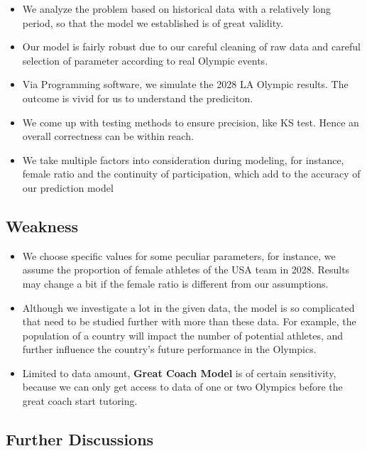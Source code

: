 \begin{itemize}
\item We analyze the problem based on historical data with a relatively long period, so that the model we established is of great validity.

\item Our model is fairly robust due to our careful cleaning of raw data and careful selection of parameter according to real Olympic events.

\item Via Programming software, we simulate the 2028 LA Olympic results. The outcome is vivid for us to understand the prediciton.

\item We come up with testing methods to ensure precision, like KS test. Hence an overall correctness can be within reach.

\item We take multiple factors into consideration during modeling, for instance, female ratio and the continuity of participation, which add to the accuracy of our prediction model
\end{itemize}

\subsection{Weakness}

\begin{itemize}
\item We choose specific values for some peculiar parameters, for instance, we assume the proportion of female athletes of the USA team in 2028. Results may change a bit if the female ratio is different from our assumptions.

\item Although we investigate a lot in the given data, the model is so complicated that need to be studied further with more than these data. For example, the population
of a country will impact the number of potential athletes, and further influence the country's future performance in the Olympics.

\item Limited to data amount, \textbf{Great Coach Model} is of certain sensitivity, because we can only get access to data of one or two Olympics before the great coach start tutoring.
\end{itemize}

\subsection{Further Discussions}
